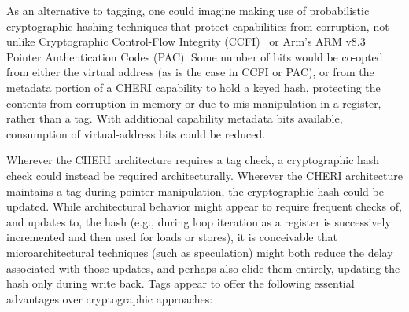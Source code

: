 As an alternative to tagging, one could imagine making use of probabilistic
cryptographic hashing techniques that protect capabilities from corruption,
not unlike Cryptographic Control-Flow Integrity
(CCFI)~\cite{Mashtizadeh_CCFICryptographicallyEnforced_2015} or Arm's ARM v8.3 Pointer
Authentication Codes (PAC).
Some number of bits would be co-opted from either the virtual address (as is
the case in CCFI or PAC), or from the metadata portion of a CHERI capability to
hold a keyed hash, protecting the contents from corruption in memory or due to
mis-manipulation in a register, rather than a tag.
With additional capability metadata bits available, consumption of
virtual-address bits could be reduced.

Wherever the CHERI architecture requires a tag check, a cryptographic hash
check could instead be required architecturally.
Wherever the CHERI architecture maintains a tag during pointer manipulation,
the cryptographic hash could be updated.
While architectural behavior might appear to require frequent checks of, and
updates to, the hash (e.g., during loop iteration as a register is
successively incremented and then used for loads or stores), it is conceivable
that microarchitectural techniques (such as speculation) might both reduce the
delay associated with those updates, and perhaps also elide them entirely,
updating the hash only during write back.
Tags appear to offer the following essential advantages over cryptographic
approaches:

